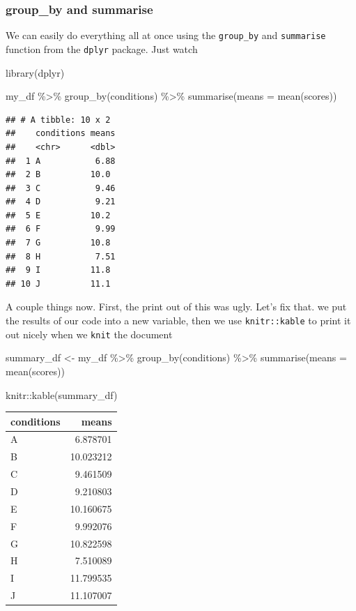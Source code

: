 \documentclass[
]{book}
\newenvironment{Shaded}{\begin{snugshade}}{\end{snugshade}}
\newcommand{\AttributeTok}[1]{\textcolor[rgb]{0.77,0.63,0.00}{#1}}
\newcommand{\FunctionTok}[1]{\textcolor[rgb]{0.00,0.00,0.00}{#1}}
\newcommand{\NormalTok}[1]{#1}
\newcommand{\OtherTok}[1]{\textcolor[rgb]{0.56,0.35,0.01}{#1}}
\newcommand{\SpecialCharTok}[1]{\textcolor[rgb]{0.00,0.00,0.00}{#1}}
\begin{document}
\hypertarget{group_by-and-summarise}{%
\subsubsection{group\_by and summarise}\label{group_by-and-summarise}}

We can easily do everything all at once using the \texttt{group\_by} and \texttt{summarise} function from the \texttt{dplyr} package. Just watch

\begin{Shaded}
\begin{Highlighting}[]
\FunctionTok{library}\NormalTok{(dplyr)}

\NormalTok{my\_df }\SpecialCharTok{\%\textgreater{}\%}
  \FunctionTok{group\_by}\NormalTok{(conditions) }\SpecialCharTok{\%\textgreater{}\%}
  \FunctionTok{summarise}\NormalTok{(}\AttributeTok{means =} \FunctionTok{mean}\NormalTok{(scores))}
\end{Highlighting}
\end{Shaded}

\begin{verbatim}
## # A tibble: 10 x 2
##    conditions means
##    <chr>      <dbl>
##  1 A           6.88
##  2 B          10.0 
##  3 C           9.46
##  4 D           9.21
##  5 E          10.2 
##  6 F           9.99
##  7 G          10.8 
##  8 H           7.51
##  9 I          11.8 
## 10 J          11.1
\end{verbatim}

A couple things now. First, the print out of this was ugly. Let's fix that. we put the results of our code into a new variable, then we use \texttt{knitr::kable} to print it out nicely when we \texttt{knit} the document

\begin{Shaded}
\begin{Highlighting}[]
\NormalTok{summary\_df }\OtherTok{\textless{}{-}}\NormalTok{ my\_df }\SpecialCharTok{\%\textgreater{}\%}
               \FunctionTok{group\_by}\NormalTok{(conditions) }\SpecialCharTok{\%\textgreater{}\%}
               \FunctionTok{summarise}\NormalTok{(}\AttributeTok{means =} \FunctionTok{mean}\NormalTok{(scores))}

\NormalTok{knitr}\SpecialCharTok{::}\FunctionTok{kable}\NormalTok{(summary\_df)}
\end{Highlighting}
\end{Shaded}

\begin{tabular}{l|r}
\hline
conditions & means\\
\hline
A & 6.878701\\
\hline
B & 10.023212\\
\hline
C & 9.461509\\
\hline
D & 9.210803\\
\hline
E & 10.160675\\
\hline
F & 9.992076\\
\hline
G & 10.822598\\
\hline
H & 7.510089\\
\hline
I & 11.799535\\
\hline
J & 11.107007\\
\hline
\end{tabular}
\end{document}
